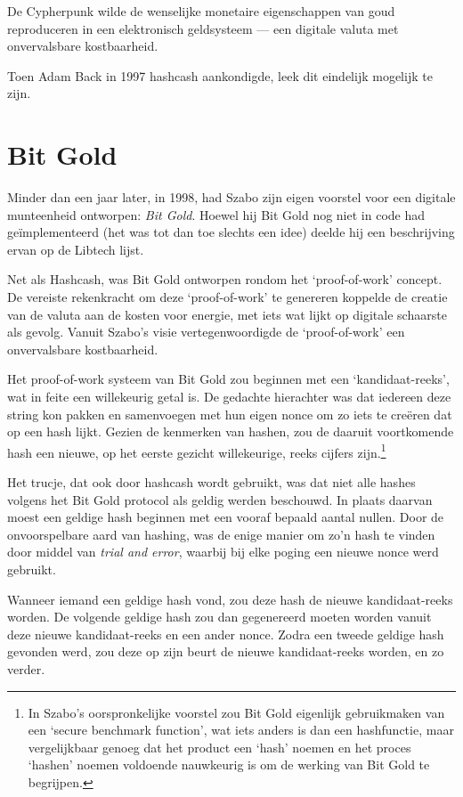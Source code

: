 \documentclass[
  a5paper,
  smalldemyvopaper,11pt,twoside,onecolumn,openright,extrafontsizes]{memoir}
\begin{document}
De Cypherpunk wilde de wenselijke monetaire eigenschappen van goud
reproduceren in een elektronisch geldsysteem --- een digitale valuta met
onvervalsbare kostbaarheid.

Toen Adam Back in 1997 hashcash aankondigde, leek dit eindelijk mogelijk
te zijn.

\section{Bit Gold}\label{bit-gold-1}

Minder dan een jaar later, in 1998, had Szabo zijn eigen voorstel voor
een digitale munteenheid ontworpen: \emph{Bit Gold}. Hoewel hij Bit Gold
nog niet in code had geïmplementeerd (het was tot dan toe slechts een
idee) deelde hij een beschrijving ervan op de Libtech lijst.

Net als Hashcash, was Bit Gold ontworpen rondom het `proof-of-work'
concept. De vereiste rekenkracht om deze `proof-of-work' te genereren
koppelde de creatie van de valuta aan de kosten voor energie, met iets
wat lijkt op digitale schaarste als gevolg. Vanuit Szabo's visie
vertegenwoordigde de `proof-of-work' een onvervalsbare kostbaarheid.

Het proof-of-work systeem van Bit Gold zou beginnen met een
`kandidaat-reeks', wat in feite een willekeurig getal is. De gedachte
hierachter was dat iedereen deze string kon pakken en samenvoegen met
hun eigen nonce om zo iets te creëren dat op een hash lijkt. Gezien de
kenmerken van hashen, zou de daaruit voortkomende hash een nieuwe, op
het eerste gezicht willekeurige, reeks cijfers zijn.\footnote{In Szabo's
  oorspronkelijke voorstel zou Bit Gold eigenlijk gebruikmaken van een
  `secure benchmark function', wat iets anders is dan een hashfunctie,
  maar vergelijkbaar genoeg dat het product een `hash' noemen en het
  proces `hashen' noemen voldoende nauwkeurig is om de werking van Bit
  Gold te begrijpen.}

Het trucje, dat ook door hashcash wordt gebruikt, was dat niet alle
hashes volgens het Bit Gold protocol als geldig werden beschouwd. In
plaats daarvan moest een geldige hash beginnen met een vooraf bepaald
aantal nullen. Door de onvoorspelbare aard van hashing, was de enige
manier om zo'n hash te vinden door middel van \emph{trial and error},
waarbij bij elke poging een nieuwe nonce werd gebruikt.

Wanneer iemand een geldige hash vond, zou deze hash de nieuwe
kandidaat-reeks worden. De volgende geldige hash zou dan gegenereerd
moeten worden vanuit deze nieuwe kandidaat-reeks en een ander nonce.
Zodra een tweede geldige hash gevonden werd, zou deze op zijn beurt de
nieuwe kandidaat-reeks worden, en zo verder.
\end{document}
